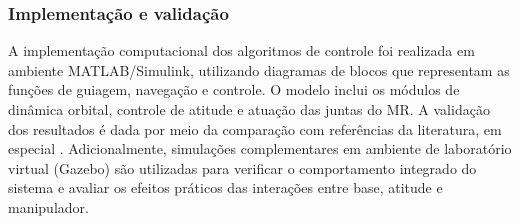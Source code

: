 \subsubsection{Implementação e validação}

A implementação computacional dos algoritmos de controle foi realizada em ambiente MATLAB/Simulink, utilizando diagramas de blocos que representam as funções de guiagem, navegação e controle.  
O modelo inclui os módulos de dinâmica orbital, controle de atitude e atuação das juntas do MR.  
A validação dos resultados é dada por meio da comparação com referências da literatura, em especial \cite{fehse2003}.  
Adicionalmente, simulações complementares em ambiente de laboratório virtual (Gazebo) são utilizadas para verificar o comportamento integrado do sistema e avaliar os efeitos práticos das interações entre base, atitude e manipulador.